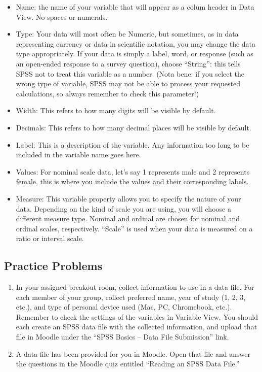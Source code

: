 \documentclass[
]{book}
\providecommand{\tightlist}{%
  \setlength{\itemsep}{0pt}\setlength{\parskip}{0pt}}
\begin{document}
\begin{itemize}
\tightlist
\item
  Name: the name of your variable that will appear as a colum header in Data View. No spaces or numerals.
\item
  Type: Your data will most often be Numeric, but sometimes, as in data representing currency or data in scientific notation, you may change the data type appropriately. If your data is simply a label, word, or response (such as an open-ended response to a survey question), choose ``String'': this tells SPSS not to treat this variable as a number. (Nota bene: if you select the wrong type of variable, SPSS may not be able to process your requested calculations, so always remember to check this parameter!)
\item
  Width: This refers to how many digits will be visible by default.
\item
  Decimals: This refers to how many decimal places will be visible by default.
\item
  Label: This is a description of the variable. Any information too long to be included in the variable name goes here.
\item
  Values: For nominal scale data, let's say 1 represents male and 2 represents female, this is where you include the values and their corresponding labels.
\item
  Measure: This variable property allows you to specify the nature of your data. Depending on the kind of scale you are using, you will choose a different measure type. Nominal and ordinal are chosen for nominal and ordinal scales, respectively. ``Scale'' is used when your data is measured on a ratio or interval scale.
\end{itemize}

\hypertarget{practice-problems}{%
\subsection{Practice Problems}\label{practice-problems}}

\begin{enumerate}
\def\labelenumi{\arabic{enumi}.}
\item
  In your assigned breakout room, collect information to use in a data file. For each member of your group, collect preferred name, year of study (1, 2, 3, etc.), and type of personal device used (Mac, PC, Chromebook, etc.). Remember to check the settings of the variables in Variable View. You should each create an SPSS data file with the collected information, and upload that file in Moodle under the ``SPSS Basics -- Data File Submission'' link.
\item
  A data file has been provided for you in Moodle. Open that file and answer the questions in the Moodle quiz entitled ``Reading an SPSS Data File.''
\end{enumerate}
\end{document}
